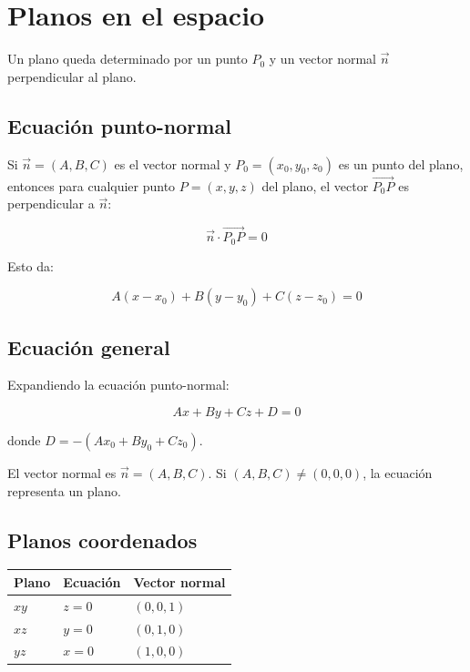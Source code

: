 \documentclass[
]{book}
\begin{document}
\section{Planos en el espacio}\label{planos-en-el-espacio}

Un plano queda determinado por un punto \(P_0\) y un vector normal \(\vec{n}\) perpendicular al plano.

\subsection{Ecuación punto-normal}\label{ecuaciuxf3n-punto-normal}

Si \(\vec{n} = (A, B, C)\) es el vector normal y \(P_0 = (x_0, y_0, z_0)\) es un punto del plano, entonces para cualquier punto \(P = (x, y, z)\) del plano, el vector \(\overrightarrow{P_0 P}\) es perpendicular a \(\vec{n}\):

\[
\vec{n} \cdot \overrightarrow{P_0 P} = 0
\]

Esto da:

\[
A(x - x_0) + B(y - y_0) + C(z - z_0) = 0
\]

\subsection{Ecuación general}\label{ecuaciuxf3n-general}

Expandiendo la ecuación punto-normal:

\[
Ax + By + Cz + D = 0
\]

donde \(D = -(Ax_0 + By_0 + Cz_0)\).

El vector normal es \(\vec{n} = (A, B, C)\). Si \((A, B, C) \neq (0, 0, 0)\), la ecuación representa un plano.

\subsection{Planos coordenados}\label{planos-coordenados}

\begin{longtable}[]{@{}lll@{}}
\toprule\noalign{}
Plano & Ecuación & Vector normal \\
\midrule\noalign{}
\endhead
\bottomrule\noalign{}
\endlastfoot
\(xy\) & \(z = 0\) & \((0, 0, 1)\) \\
\(xz\) & \(y = 0\) & \((0, 1, 0)\) \\
\(yz\) & \(x = 0\) & \((1, 0, 0)\) \\
\end{longtable}
\end{document}
